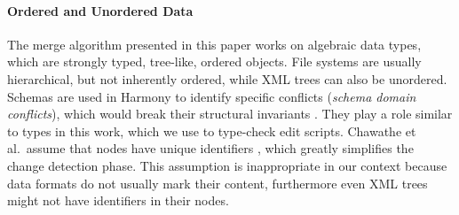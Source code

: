 \documentclass{sigplanconf}
\theoremstyle{plain}
\begin{document}
\paragraph{Ordered and Unordered Data} 
The merge algorithm presented in this paper works on algebraic data
types, which are strongly typed, tree-like, ordered objects. File
systems are usually hierarchical, but not inherently ordered, while
XML trees can also be unordered.
%
Schemas are used in Harmony to identify specific
conflicts (\emph{schema domain conflicts}), which would break their
structural invariants \cite{Pierce07}.
%
They play a role similar to types in this work, which we use to
type-check edit scripts.
%
Chawathe et al.\ assume that nodes have unique identifiers
\cite{Chawathe96}, which greatly simplifies the change detection
phase.
%
This assumption is inappropriate in our context because data formats
do not usually mark their content, furthermore even XML trees
might not have identifiers in their nodes.
	
\end{document}
